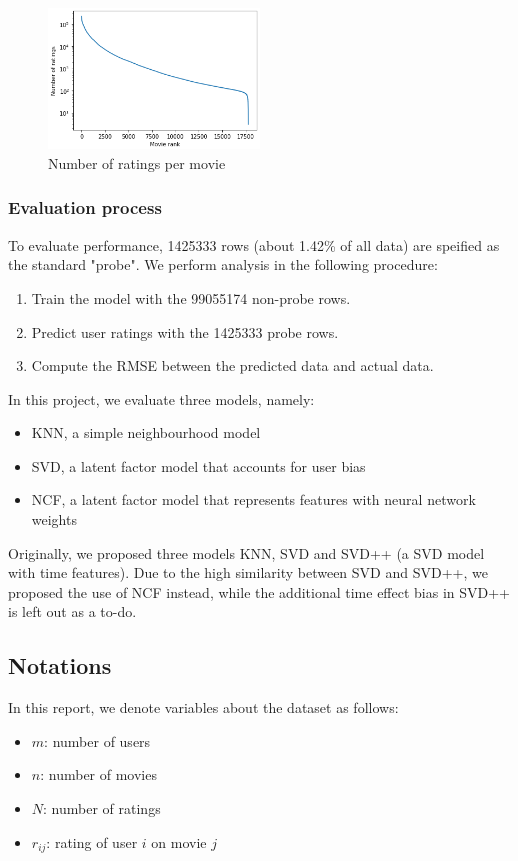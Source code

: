 \documentclass[final]{cvpr}
\begin{document}
\begin{figure}
	\includegraphics[width=0.5\textwidth]{screenshot20210422223229.png}
	\caption{Number of ratings per movie}
	\label{fig:movie-rating-freq}
\end{figure}

\subsubsection{Evaluation process}
To evaluate performance, 1425333 rows (about 1.42\% of all data) are speified as the standard "probe".
We perform analysis in the following procedure:

\begin{enumerate}
	\item Train the model with the 99055174 non-probe rows.
	\item Predict user ratings with the 1425333 probe rows.
	\item Compute the \ac{RMSE} between the predicted data and actual data.
\end{enumerate}

In this project, we evaluate three models, namely:

\begin{itemize}
	\item \ac{KNN}, a simple neighbourhood model
	\item \ac{SVD}, a latent factor model that accounts for user bias
	\item \ac{NCF}, a latent factor model that represents features with neural network weights
\end{itemize}

Originally, we proposed three models KNN, SVD and SVD++ (a SVD model with time features).
Due to the high similarity between SVD and SVD++,
we proposed the use of NCF instead,
while the additional time effect bias in SVD++ is left out as a to-do.

\subsection{Notations}
In this report, we denote variables about the dataset as follows:
\begin{itemize}
	\item $m$: number of users
	\item $n$: number of movies
	\item $N$: number of ratings
	\item $r_{ij}$: rating of user $i$ on movie $j$
\end{itemize}
\end{document}
